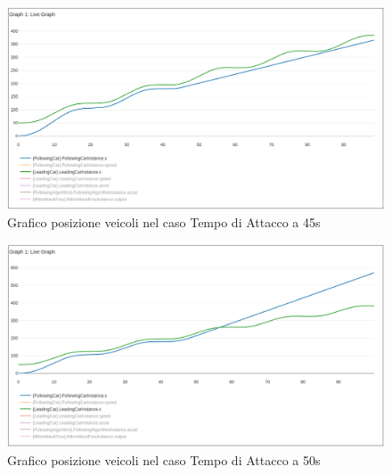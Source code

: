 \begin{figure}[H]
	\centering
	\includegraphics[width=\textwidth]{img/AttackAccel0T45X.png}
	\caption{Grafico posizione veicoli nel caso Tempo di Attacco a 45s}
\end{figure}

\begin{figure}[H]
	\centering
	\includegraphics[width=\textwidth]{img/AttackAccel0T50X.png}
	\caption{Grafico posizione veicoli nel caso Tempo di Attacco a 50s}
\end{figure}


